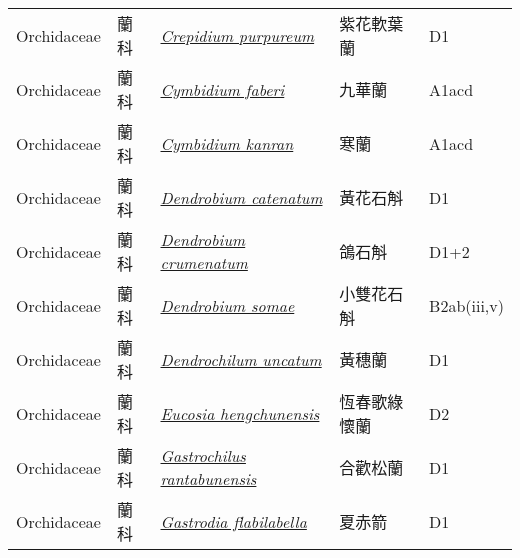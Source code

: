 {\begin{longtable}{p{2.5cm}p{2cm}p{5cm}p{2.5cm}p{3cm}}
    Orchidaceae & 蘭科 & \href{http://www.theplantlist.org/tpl1.1/search?q=Crepidium+purpureum}{\textit{Crepidium purpureum} } & 紫花軟葉蘭 & D1 \index{Crepidium@\textit{Crepidium}!purpureum@\textit{purpureum}}  \index{紫花軟葉蘭} \\
    Orchidaceae & 蘭科 & \href{http://www.theplantlist.org/tpl1.1/search?q=Cymbidium+faberi}{\textit{Cymbidium faberi} } & 九華蘭 & A1acd \index{Cymbidium@\textit{Cymbidium}!faberi@\textit{faberi}}  \index{九華蘭} \\
    Orchidaceae & 蘭科 & \href{http://www.theplantlist.org/tpl1.1/search?q=Cymbidium+kanran}{\textit{Cymbidium kanran} } & 寒蘭 & A1acd \index{Cymbidium@\textit{Cymbidium}!kanran@\textit{kanran}}  \index{寒蘭} \\
    Orchidaceae & 蘭科 & \href{http://www.theplantlist.org/tpl1.1/search?q=Dendrobium+catenatum}{\textit{Dendrobium catenatum} } & 黃花石斛 & D1 \index{Dendrobium@\textit{Dendrobium}!catenatum@\textit{catenatum}}  \index{黃花石斛} \\
    Orchidaceae & 蘭科 & \href{http://www.theplantlist.org/tpl1.1/search?q=Dendrobium+crumenatum}{\textit{Dendrobium crumenatum} } & 鴿石斛 & D1+2 \index{Dendrobium@\textit{Dendrobium}!crumenatum@\textit{crumenatum}}  \index{鴿石斛} \\
    Orchidaceae & 蘭科 & \href{http://www.theplantlist.org/tpl1.1/search?q=Dendrobium+somae}{\textit{Dendrobium somae} } & 小雙花石斛 & B2ab(iii,v) \index{Dendrobium@\textit{Dendrobium}!somae@\textit{somae}}  \index{小雙花石斛} \\
    Orchidaceae & 蘭科 & \href{http://www.theplantlist.org/tpl1.1/search?q=Dendrochilum+uncatum}{\textit{Dendrochilum uncatum} } & 黃穗蘭 & D1 \index{Dendrochilum@\textit{Dendrochilum}!uncatum@\textit{uncatum}}  \index{黃穗蘭} \\
    Orchidaceae & 蘭科 & \href{http://www.theplantlist.org/tpl1.1/search?q=Eucosia+hengchunensis}{\textit{Eucosia hengchunensis} } & 恆春歌綠懷蘭 & D2 \index{Eucosia@\textit{Eucosia}!hengchunensis@\textit{hengchunensis}}  \index{恆春歌綠懷蘭} \\
    Orchidaceae & 蘭科 & \href{http://www.theplantlist.org/tpl1.1/search?q=Gastrochilus+rantabunensis}{\textit{Gastrochilus rantabunensis} } & 合歡松蘭 & D1 \index{Gastrochilus@\textit{Gastrochilus}!rantabunensis@\textit{rantabunensis}}  \index{合歡松蘭} \\
    Orchidaceae & 蘭科 & \href{http://www.theplantlist.org/tpl1.1/search?q=Gastrodia+flabilabella}{\textit{Gastrodia flabilabella} } & 夏赤箭 & D1 \index{Gastrodia@\textit{Gastrodia}!flabilabella@\textit{flabilabella}}  \index{夏赤箭} \\

\end{longtable}}
